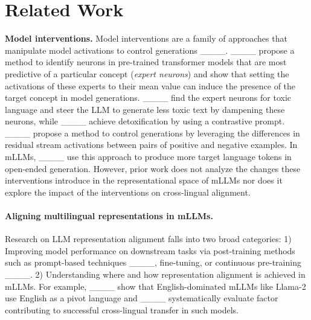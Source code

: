 \section{Related Work}
\textbf{Model interventions.} Model interventions are a family of approaches that manipulate model activations to control generations ____. ____ propose a method to identify neurons in pre-trained transformer models that are most predictive of a particular concept (\textit{expert neurons}) and show that setting the activations of these experts to their mean value can induce the presence of the target concept in model generations. ____ find the expert neurons for toxic language and steer the LLM to generate less toxic text by dampening these neurons, while ____ achieve detoxification by using a contrastive prompt. ____ propose a method to control generations by leveraging the differences in residual stream activations between pairs of positive and negative examples. In mLLMs,  ____ use this approach to produce more target language tokens in open-ended generation. However, prior work does not analyze the changes these interventions introduce in the representational space of mLLMs nor does it explore the impact of the interventions on cross-lingual alignment.


\paragraph{Aligning multilingual representations in mLLMs.} 
Research on LLM representation alignment falls into two broad categories:  1) Improving model performance on downstream tasks via post-training methods such as prompt-based techniques ____, fine-tuning, or continuous pre-training ____. 2)  Understanding where and how representation alignment is achieved in mLLMs. For example, ____ show that English-dominated mLLMs like Llama-2 use English as a pivot language and ____ systematically evaluate factor contributing to successful cross-lingual transfer in such models.